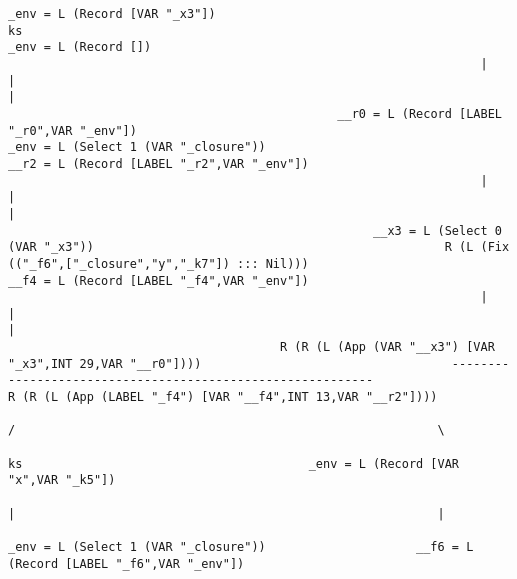 \begin{landscape}
\begin{lstlisting}[basicstyle=\fontsize{4.5}{5.5}\selectfont\ttfamily]
                                                    _env = L (Record [VAR "_x3"])                                                                           ks                                                                                _env = L (Record [])
                                                                  |                                                                                         |                                                                                          |
                                              __r0 = L (Record [LABEL "_r0",VAR "_env"])                                                   _env = L (Select 1 (VAR "_closure"))                                                    __r2 = L (Record [LABEL "_r2",VAR "_env"])
                                                                  |                                                                                         |                                                                                          |
                                                   __x3 = L (Select 0 (VAR "_x3"))                                                 R (L (Fix (("_f6",["_closure","y","_k7"]) ::: Nil)))                                            __f4 = L (Record [LABEL "_f4",VAR "_env"])
                                                                  |                                                                                         |                                                                                          |
                                      R (R (L (App (VAR "__x3") [VAR "_x3",INT 29,VAR "__r0"])))                                   -----------------------------------------------------------                            R (R (L (App (LABEL "_f4") [VAR "__f4",INT 13,VAR "__r2"])))
                                                                                                                                  /                                                           \
                                                                                                                                  ks                                        _env = L (Record [VAR "x",VAR "_k5"])
                                                                                                                                  |                                                           |
                                                                                                                 _env = L (Select 1 (VAR "_closure"))                     __f6 = L (Record [LABEL "_f6",VAR "_env"])

\end{lstlisting}
\end{landscape}
